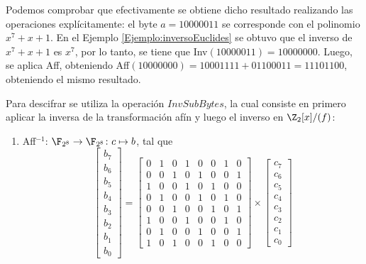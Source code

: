     Podemos comprobar que efectivamente se obtiene dicho resultado realizando las operaciones explícitamente: el byte $a = 10000011$ se corresponde con el polinomio $x^7 + x + 1$. En el Ejemplo \ref{Ejemplo:inversoEuclides} se obtuvo que el inverso de $x^7 + x + 1$ es $x^7$, por lo tanto, se tiene que Inv$(10000011) = 10000000$. Luego, se aplica Aff, obteniendo Aff$(10000000) = 10001111 + 01100011 = 11101100$, obteniendo el mismo resultado.
    

\medskip
Para descifrar se utiliza la operación $InvSubBytes$, la cual consiste en primero aplicar la inversa de la transformación afín y luego el inverso en $\Z_2[x]/(f)$:
\vspace{-0.3em}
\begin{enumerate}[label={--}]
    \item Aff$^{-1}$: $\F_{2^8} \to \F_{2^8} \colon c \mapsto b$, tal que
    \vspace{-0.5em}
        \[
            \begin{bmatrix} 
            b_7 \\ b_6 \\ b_5 \\ b_4 \\ b_3 \\ b_2 \\ b_1 \\ b_0 
            \end{bmatrix} 
        = 
            \begin{bmatrix} 
            0 & 1 & 0 & 1 & 0 & 0 & 1 & 0 \\ 
            0 & 0 & 1 & 0 & 1 & 0 & 0 & 1 \\ 
            1 & 0 & 0 & 1 & 0 & 1 & 0 & 0 \\ 
            0 & 1 & 0 & 0 & 1 & 0 & 1 & 0 \\ 
            0 & 0 & 1 & 0 & 0 & 1 & 0 & 1 \\ 
            1 & 0 & 0 & 1 & 0 & 0 & 1 & 0 \\ 
            0 & 1 & 0 & 0 & 1 & 0 & 0 & 1 \\ 
            1 & 0 & 1 & 0 & 0 & 1 & 0 & 0 
            \end{bmatrix} 
        \times 
            \begin{bmatrix} 
            c_7 \\ c_6 \\ c_5 \\ c_4 \\ c_3 \\ c_2 \\ c_1 \\ c_0 

\end{bmatrix}\]
\end{enumerate}
